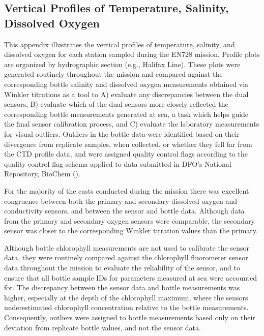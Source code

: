 \documentclass[12pt]{article}\usepackage[]{graphicx}\usepackage[]{color}
\begin{document}
\clearpage

\begin{appendices}

\pagestyle{plain}

\section{Vertical Profiles of Temperature, Salinity, Dissolved Oxygen}\label{appA}

This appendix illustrates the vertical profiles of temperature, salinity, and dissolved oxygen for each station sampled during the EN728 mission. Profile plots are organized by hydrographic section (e.g., Halifax Line). These plots were generated routinely throughout the mission and compared against the corresponding bottle salinity and dissolved oxygen measurements obtained via Winkler titrations as a tool to A) evaluate any discrepancies between the dual sensors, B) evaluate which of the dual sensors more closely reflected the corresponding bottle measurements generated at sea, a task which helps guide the final sensor calibration process, and C) evaluate the laboratory measurements for visual outliers. Outliers in the bottle data were identified based on their divergence from replicate samples, when collected, or whether they fell far from the CTD profile data, and were assigned quality control flags according to the quality control flag schema applied to data submitted in DFO's National Repository, BioChem ().

For the majority of the casts conducted during the mission there was excellent congruence between both the primary and secondary dissolved oxygen and conductivity sensors, and between the sensor and bottle data. Although data from the primary and secondary oxygen sensors were comparable, the secondary sensor was closer to the corresponding Winkler titration values than the primary.

Although bottle chlorophyll measurements are not used to calibrate the sensor data, they were routinely compared against the chlorophyll fluorometer sensor data throughout the mission to evaluate the reliability of the sensor, and to ensure that all bottle sample IDs for parameters measured at sea were accounted for. The discrepancy between the sensor data and bottle measurements was higher, especially at the depth of the chlorophyll maximum, where the sensors underestimated chlorophyll concentration relative to the bottle measurements. Consequently, outliers were assigned to bottle measurements based only on their deviation from replicate bottle values, and not the sensor data.
\begin{figure}[H]


\end{figure}
\end{appendices}
\end{document}
